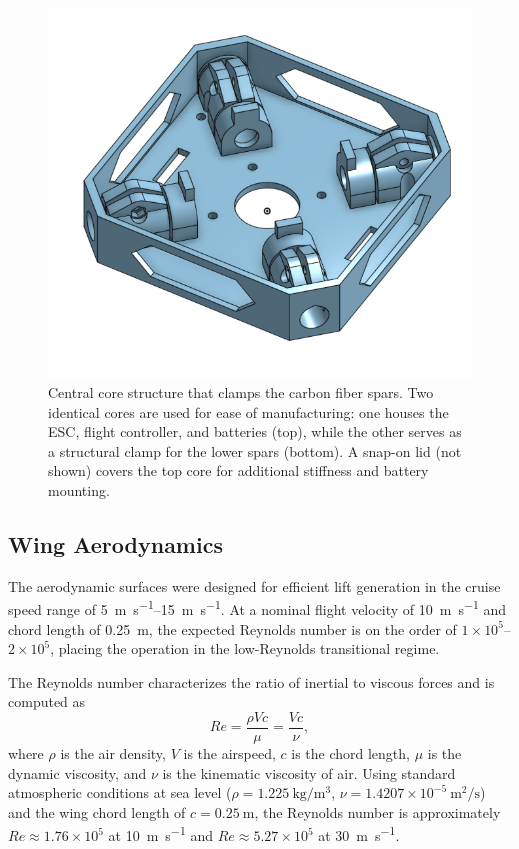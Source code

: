 \begin{figure}[htbp]
\centering
\includegraphics[width=0.6\linewidth]{figures/core.png}
\caption{Central core structure that clamps the carbon fiber spars. Two identical cores are used for ease of manufacturing: one houses the ESC, flight controller, and batteries (top), while the other serves as a structural clamp for the lower spars (bottom). A snap-on lid (not shown) covers the top core for additional stiffness and battery mounting.}
\label{fig:core_structure}
\end{figure}

\subsection{Wing Aerodynamics}

The aerodynamic surfaces were designed for efficient lift generation in the cruise speed range of \SIrange{5}{15}{\meter\per\second}.  
At a nominal flight velocity of \SI{10}{\meter\per\second} and chord length of \SI{0.25}{\meter}, the expected Reynolds number is on the order of \(1\times10^5\)–\(2\times10^5\), placing the operation in the low-Reynolds transitional regime.

The Reynolds number characterizes the ratio of inertial to viscous forces and is computed as
\begin{equation}
Re = \frac{\rho V c}{\mu} = \frac{V c}{\nu},
\label{eq:reynolds_number}
\end{equation}
where \(\rho\) is the air density, \(V\) is the airspeed, \(c\) is the chord length, \(\mu\) is the dynamic viscosity, and \(\nu\) is the kinematic viscosity of air.
Using standard atmospheric conditions at sea level (\(\rho = 1.225~\mathrm{kg/m^3}\), \(\nu = 1.4207 \times 10^{-5}~\mathrm{m^2/s}\)) and the wing chord length of \(c = 0.25~\mathrm{m}\), the Reynolds number is approximately \(Re \approx 1.76 \times 10^5\) at \SI{10}{\meter\per\second} and \(Re \approx 5.27 \times 10^5\) at \SI{30}{\meter\per\second}.

